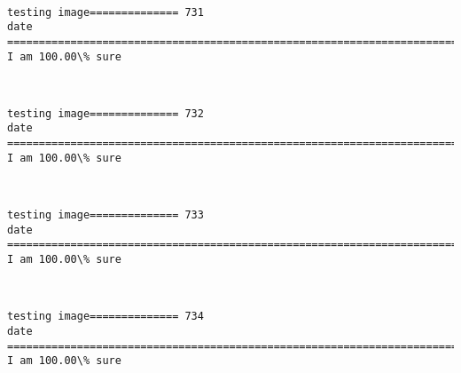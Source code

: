 \documentclass[11pt]{article}
\begin{document}
    \begin{center}
    \end{center}
    { \hspace*{\fill} \\}
    
    \begin{Verbatim}[commandchars=\\\{\}]
testing image============== 731
date
============================================================================
I am 100.00\% sure

    \end{Verbatim}

    \begin{center}
    \end{center}
    { \hspace*{\fill} \\}
    
    \begin{Verbatim}[commandchars=\\\{\}]
testing image============== 732
date
============================================================================
I am 100.00\% sure

    \end{Verbatim}

    \begin{center}
    \end{center}
    { \hspace*{\fill} \\}
    
    \begin{Verbatim}[commandchars=\\\{\}]
testing image============== 733
date
============================================================================
I am 100.00\% sure

    \end{Verbatim}

    \begin{center}
    \end{center}
    { \hspace*{\fill} \\}
    
    \begin{Verbatim}[commandchars=\\\{\}]
testing image============== 734
date
============================================================================
I am 100.00\% sure

    \end{Verbatim}
\end{document}
